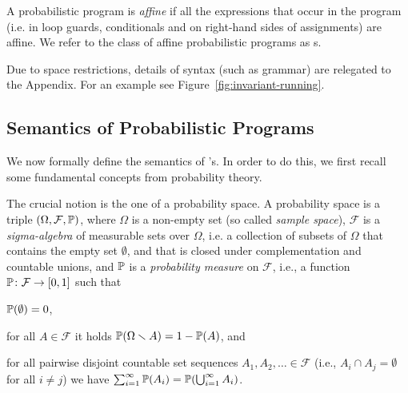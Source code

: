 \smallskip{}
A probabilistic program is \emph{affine} if all the expressions that occur in 
the program (i.e. in loop guards, conditionals and on right-hand sides of 
assignments) are affine. We refer to the class of affine probabilistic programs 
as \APP s.

Due to space restrictions, details of syntax (such as grammar) are relegated to 
the Appendix.
For an example see Figure~\ref{fig:invariant-running}.




\vspace{-1em}
\subsection{Semantics of Probabilistic Programs}\label{subsec:semantics}
\vspace{-0.5em}

We now formally define the semantics of \PP's.
In order to do this, we first recall some fundamental concepts from probability
theory.

\smallskip{}
The crucial notion is the one of a probability space. A probability space is a triple
$(\Omega,\mathcal{F},\mathbb{P})$, where $\Omega$ is a non-empty set (so called
\emph{sample space}), $\mathcal{F}$ is a \emph{sigma-algebra} of measurable 
sets over $\Omega$,
i.e. a collection of subsets of $\Omega$ that contains the empty set
$\emptyset$, and that is closed under complementation and countable unions, and
$\mathbb{P}$ is a \emph{probability measure} on $\mathcal{F}$, i.e., a function
$\mathbb{P}\colon \mathcal{F}\rightarrow[0,1]$ such that
\begin{compactitem}
\item $\mathbb{P}(\emptyset)=0$,
\item for all $A\in \mathcal{F}$ it holds $\mathbb{P}(\Omega\smallsetminus
A)=1-\mathbb{P}(A)$, and
\item for all pairwise disjoint countable set sequences $A_1,A_2,\dots \in
\mathcal{F}$ (i.e., $A_i \cap A_j = \emptyset$ for all $i\neq j$)
we have $\sum_{i=1}^{\infty}\mathbb{P}(A_i)=\mathbb{P}(\bigcup_{i=1}^{\infty} A_i)$.
\end{compactitem}

